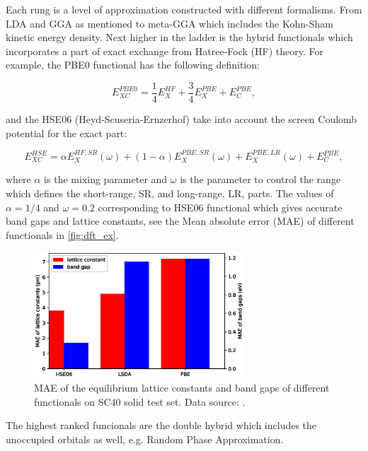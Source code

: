 Each rung is a level of approximation constructed with different formalisms. From LDA and GGA as mentioned to meta-GGA which includes the Kohn-Sham kinetic energy density. Next higher in the ladder is the hybrid functionals which incorporates a part of exact exchange from Hatree-Fock (HF) theory. For example, the PBE0 functional\cite{Carlo1999} has the following definition:

\begin{equation}
E_{XC}^{PBE0}=\frac{1}{4}E_X^{HF}+\frac{3}{4}E_X^{PBE}+E_C^{PBE},
\end{equation}

and the HSE06 (Heyd-Scuseria-Ernzerhof)\cite{Jochen2003} take into account the screen Coulomb potential for the exact part:

\begin{equation}
E_{XC}^{HSE}=\alpha E_X^{HF,SR}(\omega)+(1-\alpha)E_X^{PBE,SR}(\omega)+E_X^{PBE,LR}(\omega)+E_C^{PBE},
\end{equation}

where $\alpha$ is the mixing parameter and $\omega$ is the parameter to control the range which defines the short-range, SR, and long-range, LR, parts. The values of $\alpha=1/4$ and $\omega=0.2$ corresponding to HSE06 functional which gives accurate band gaps and lattice constants, see the Mean absolute error (MAE) of different functionals in \autoref{fig:dft_ex}. 


\begin{figure}[htbp!] 
\centering  
\includegraphics[width=0.7\textwidth]{lat_ex.eps}
\caption{ MAE of the equilibrium lattice constants and band gaps of different functionals on SC40 solid test set. Data source: \cite{Lucero2012}.}  
\label{fig:dft_ex}
\end{figure} 

The highest ranked funcionals are the double hybrid which includes the unoccupied orbitals as well, e.g. Random Phase Approximation\cite{Langreth1980}. 

